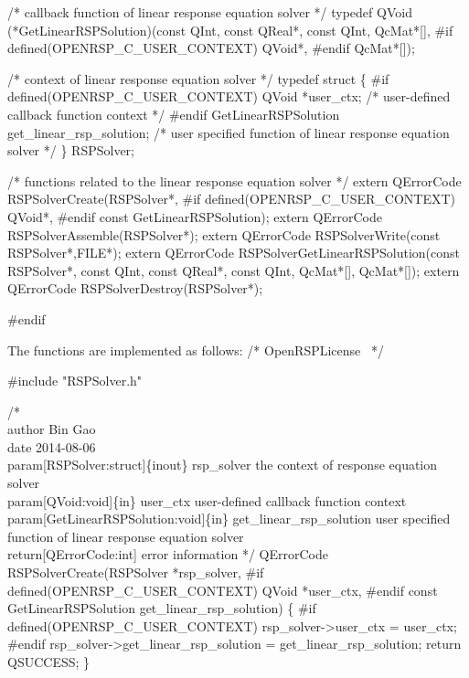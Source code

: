 /* callback function of linear response equation solver */
typedef QVoid (*GetLinearRSPSolution)(const QInt,
                                      const QReal*,
                                      const QInt,
                                      QcMat*[],
#if defined(OPENRSP_C_USER_CONTEXT)
                                      QVoid*,
#endif
                                      QcMat*[]);

/* context of linear response equation solver */
typedef struct \{
#if defined(OPENRSP_C_USER_CONTEXT)
    QVoid *user_ctx;                              /* user-defined callback function context */
#endif
    GetLinearRSPSolution get_linear_rsp_solution; /* user specified function of linear response equation solver */
\} RSPSolver;

/* functions related to the linear response equation solver */
extern QErrorCode RSPSolverCreate(RSPSolver*,
#if defined(OPENRSP_C_USER_CONTEXT)
                                  QVoid*,
#endif
                                  const GetLinearRSPSolution);
extern QErrorCode RSPSolverAssemble(RSPSolver*);
extern QErrorCode RSPSolverWrite(const RSPSolver*,FILE*);
extern QErrorCode RSPSolverGetLinearRSPSolution(const RSPSolver*,
                                                const QInt,
                                                const QReal*,
                                                const QInt,
                                                QcMat*[],
                                                QcMat*[]);
extern QErrorCode RSPSolverDestroy(RSPSolver*);

#endif
\nwendcode{}\nwdocspar

The functions are implemented as follows:
\nwenddocs{}\endmoddef
/*
  \LA{}OpenRSPLicense~{\nwtagstyle{}}\RA{}
*/

#include "RSPSolver.h"

/*%
    \\author Bin Gao
    \\date 2014-08-06
    \\param[RSPSolver:struct]\{inout\} rsp_solver the context of response equation solver
    \\param[QVoid:void]\{in\} user_ctx user-defined callback function context
    \\param[GetLinearRSPSolution:void]\{in\} get_linear_rsp_solution user specified function of
        linear response equation solver
    \\return[QErrorCode:int] error information
*/
QErrorCode RSPSolverCreate(RSPSolver *rsp_solver,
#if defined(OPENRSP_C_USER_CONTEXT)
                           QVoid *user_ctx,
#endif
                           const GetLinearRSPSolution get_linear_rsp_solution)
\{
#if defined(OPENRSP_C_USER_CONTEXT)
    rsp_solver->user_ctx = user_ctx;
#endif
    rsp_solver->get_linear_rsp_solution = get_linear_rsp_solution;
    return QSUCCESS;
\}

